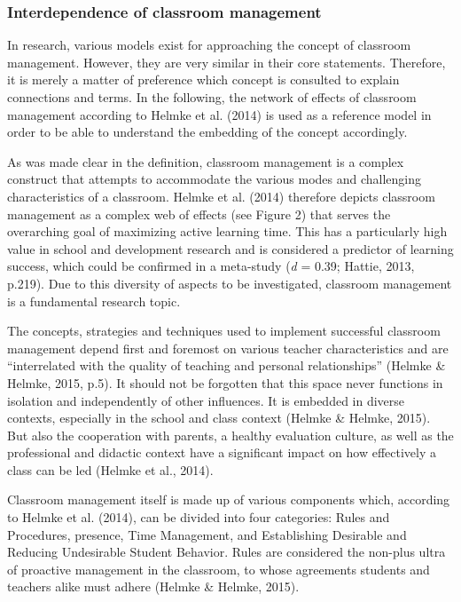 \documentclass[
  man]{apa6}
\begin{document}
\subsubsection{Interdependence of classroom management}\label{interdependence-of-classroom-management}

In research, various models exist for approaching the concept of classroom management. However, they are very similar in their core statements. Therefore, it is merely a matter of preference which concept is consulted to explain connections and terms. In the following, the network of effects of classroom management according to Helmke et al. (2014) is used as a reference model in order to be able to understand the embedding of the concept accordingly.

As was made clear in the definition, classroom management is a complex construct that attempts to accommodate the various modes and challenging characteristics of a classroom. Helmke et al. (2014) therefore depicts classroom management as a complex web of effects (see Figure 2) that serves the overarching goal of maximizing active learning time. This has a particularly high value in school and development research and is considered a predictor of learning success, which could be confirmed in a meta-study (\emph{d} = 0.39; Hattie, 2013, p.219). Due to this diversity of aspects to be investigated, classroom management is a fundamental research topic.

The concepts, strategies and techniques used to implement successful classroom management depend first and foremost on various teacher characteristics and are ``interrelated with the quality of teaching and personal relationships'' (Helmke \& Helmke, 2015, p.5). It should not be forgotten that this space never functions in isolation and independently of other influences. It is embedded in diverse contexts, especially in the school and class context (Helmke \& Helmke, 2015). But also the cooperation with parents, a healthy evaluation culture, as well as the professional and didactic context have a significant impact on how effectively a class can be led (Helmke et al., 2014).

Classroom management itself is made up of various components which, according to Helmke et al. (2014), can be divided into four categories: Rules and Procedures, presence, Time Management, and Establishing Desirable and Reducing Undesirable Student Behavior. Rules are considered the non-plus ultra of proactive management in the classroom, to whose agreements students and teachers alike must adhere (Helmke \& Helmke, 2015).
\end{document}
